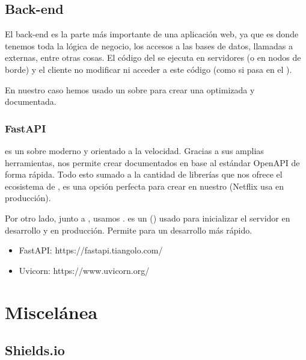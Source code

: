 \subsection{Back-end}

El back-end es la parte más importante de una aplicación web, ya que es donde tenemos toda la lógica de negocio, los accesos a las bases de datos, llamadas a  externas, entre otras cosas. El código del  se ejecuta en servidores (o en nodos de borde) y el cliente no modificar ni acceder a este código (como si pasa en el  ).

En nuestro caso hemos usado un  sobre  para crear una  optimizada y documentada.

\subsubsection{FastAPI}

 es un  sobre  moderno y orientado a la velocidad. Gracias a sus amplias herramientas, nos permite crear  documentados en base al estándar OpenAPI de forma rápida. Todo esto sumado a la cantidad de librerías que nos ofrece el ecosistema de ,  es una opción perfecta para crear  en nuestro  (Netflix usa  en producción).

Por otro lado, junto a , usamos .  es un  ()  usado para inicializar el servidor en desarrollo y en producción. Permite  para un desarrollo más rápido.

\begin{itemize}
  \item FastAPI: https://fastapi.tiangolo.com/
  \item Uvicorn: https://www.uvicorn.org/
\end{itemize}


\section{Miscelánea}

\subsection{Shields.io}


